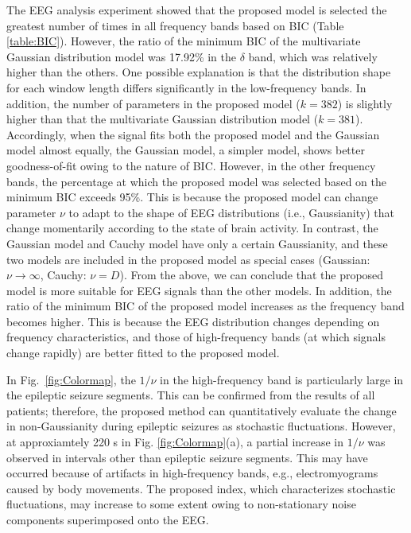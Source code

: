 \documentclass[journal]{IEEEtran}
\begin{document}
The EEG analysis experiment showed that the proposed model is selected the greatest number of times in all frequency bands based on BIC (Table \ref{table:BIC}).
However, the ratio of the minimum BIC of the multivariate Gaussian distribution model was 17.92\% in the $\delta$ band, which was relatively higher than the others.
One possible explanation is that the distribution shape for each window length differs significantly in the low-frequency bands.
In addition, the number of parameters in the proposed model ($k = 382$) is slightly higher than that  the multivariate Gaussian distribution model ($k = 381$).
Accordingly, when the signal fits both the proposed model and the Gaussian model almost equally, the Gaussian model, a simpler model, shows better goodness-of-fit owing to the nature of BIC.
However, in the other frequency bands, the percentage at which the proposed model was selected based on the minimum BIC exceeds 95\%.
This is because the proposed model can change parameter $\nu$ to adapt to the shape of EEG distributions (i.e., Gaussianity) that change momentarily according to the state of brain activity.
In contrast, the Gaussian model and Cauchy model have only a certain Gaussianity, and these two models are included in the proposed model as special cases (Gaussian: $\nu \rightarrow \infty$, Cauchy: $\nu = D$).
From the above, we can conclude that the proposed model is more suitable for EEG signals than the other models.
In addition, the ratio of the minimum BIC of the proposed model increases as the frequency band becomes higher.
This is because the EEG distribution changes depending on frequency characteristics, and those of high-frequency bands (at which signals change rapidly) are better fitted to the proposed model.

In Fig.~\ref{fig:Colormap}, the $1/\nu$ in the high-frequency band is particularly large in the epileptic seizure segments.
This can be confirmed from the results of all patients; therefore, the proposed method can quantitatively evaluate the change in non-Gaussianity during epileptic seizures as stochastic fluctuations.
However, at approxiamtely 220 s in Fig. \ref{fig:Colormap}(a), a partial increase in $1/\nu$ was observed in intervals other than epileptic seizure segments.
This may have occurred because of artifacts in high-frequency bands, e.g., electromyograms caused by body movements.
The proposed index, which characterizes stochastic fluctuations, may increase to some extent owing to non-stationary noise components superimposed onto the EEG.
\end{document}
